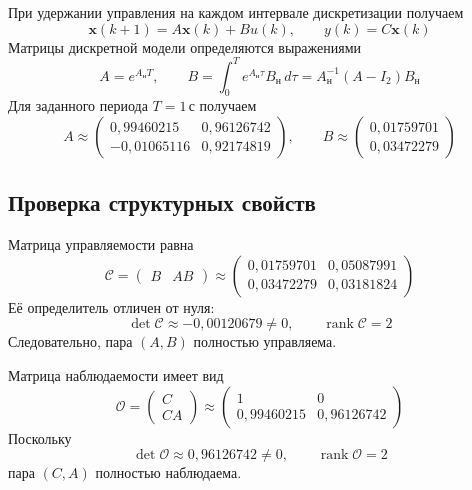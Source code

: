 При удержании управления на каждом интервале дискретизации получаем
\begin{equation}
  \bm x(k+1)=A\bm x(k)+Bu(k),
  \qquad y(k)=C\bm x(k)
  \label{eq:discrete-plant}
\end{equation}
Матрицы дискретной модели определяются выражениями
\begin{equation}
  A=e^{A_{\text{н}}T},
  \qquad
  B=\int_0^T e^{A_{\text{н}}\tau}B_{\text{н}}\,d\tau
    =A_{\text{н}}^{-1}(A-I_2)B_{\text{н}}
  \label{eq:discretization}
\end{equation}
Для заданного периода $T=1\,\text{с}$ получаем
\begin{equation}
  A\approx
  \begin{pmatrix}
    0{,}99460215&0{,}96126742\\
    -0{,}01065116&0{,}92174819
  \end{pmatrix},
  \qquad
  B\approx\begin{pmatrix}0{,}01759701\\0{,}03472279\end{pmatrix}
  \label{eq:discrete-matrices}
\end{equation}

\subsection{Проверка структурных свойств}

Матрица управляемости равна
\begin{equation}
  \mathcal C=\begin{pmatrix}B&AB\end{pmatrix}
  \approx
  \begin{pmatrix}
    0{,}01759701&0{,}05087991\\
    0{,}03472279&0{,}03181824
  \end{pmatrix}
  \label{eq:controllability}
\end{equation}
Её определитель отличен от нуля:
\begin{equation}
  \det\mathcal C\approx-0{,}00120679\ne0,
  \qquad \operatorname{rank}\mathcal C=2
  \label{eq:controllability-rank}
\end{equation}
Следовательно, пара $(A,B)$ полностью управляема.

Матрица наблюдаемости имеет вид
\begin{equation}
  \mathcal O=\begin{pmatrix}C\\CA\end{pmatrix}
  \approx
  \begin{pmatrix}
    1&0\\
    0{,}99460215&0{,}96126742
  \end{pmatrix}
  \label{eq:observability}
\end{equation}
Поскольку
\begin{equation}
  \det\mathcal O\approx0{,}96126742\ne0,
  \qquad \operatorname{rank}\mathcal O=2
  \label{eq:observability-rank}
\end{equation}
пара $(C,A)$ полностью наблюдаема.

